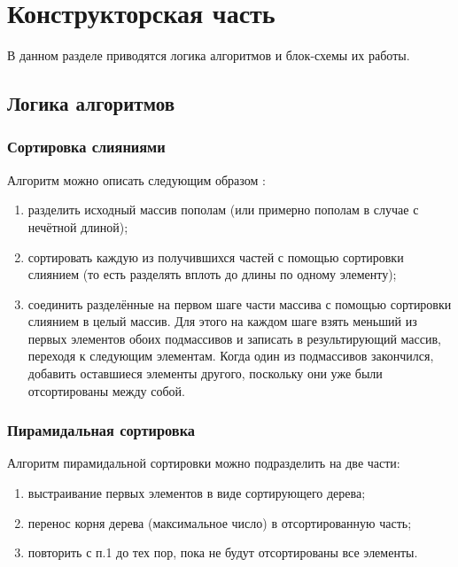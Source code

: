 \documentclass[12pt,a4paper]{scrartcl}
\begin{document}
	\newpage
	\section{Конструкторская часть}

	В данном разделе приводятся логика алгоритмов и блок-схемы их работы.

	\subsection{Логика алгоритмов}
	
	\subsubsection{Сортировка слияниями}
		
		Алгоритм можно описать следующим образом \cite{MergeSort}:
		\begin{enumerate}
			\item разделить исходный массив пополам (или примерно пополам в случае с нечётной длиной);
			\item сортировать каждую из получившихся частей с помощью сортировки слиянием (то есть разделять вплоть до длины по одному элементу);
			\item соединить разделённые на первом шаге части массива с помощью сортировки слиянием в целый массив. Для этого на каждом шаге взять меньший из первых элементов обоих подмассивов и записать в результирующий массив, переходя к следующим элементам. Когда один из подмассивов закончился, добавить оставшиеся элементы другого, поскольку они уже были отсортированы между собой.
		\end{enumerate}
		

	\subsubsection{Пирамидальная сортировка}

		Алгоритм пирамидальной сортировки можно подразделить на две части:
		\begin{enumerate}
			\item выстраивание первых элементов в виде сортирующего дерева;
			\item перенос корня дерева (максимальное число) в отсортированную часть;
			\item повторить с п.1 до тех пор, пока не будут отсортированы все элементы.
		\end{enumerate}
		\cite{Alg}
	
\end{document}
